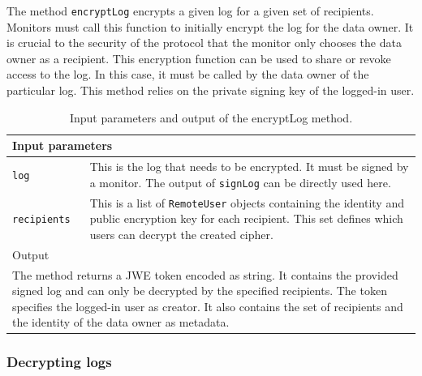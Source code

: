 \documentclass[../main.tex]{subfiles}
\begin{document}
The method \verb|encryptLog| encrypts a given log for a given set of recipients.
Monitors must call this function to initially encrypt the log for the data owner.
It is crucial to the security of the protocol that the monitor only chooses the data owner as a recipient. 
This encryption function can be used to share or revoke access to the log.
In this case, it must be called by the data owner of the particular log. 
This method relies on the private signing key of the logged-in user.
\begin{table}[ht]
    \centering
    \begin{tabular}{|p{3cm}p{10cm}|}
        \hline
        \multicolumn{2}{|l|}{Input parameters}    \\ \hline
        \verb|log|              & This is the log that needs to be encrypted. It must be signed by a monitor. The output of \verb|signLog| can be directly used here.           \\
        \verb|recipients|       & This is a list of \verb|RemoteUser| objects containing the identity and public encryption key for each recipient. This set defines which users can decrypt the created cipher.           \\ \hline
        \multicolumn{2}{|l|}{Output}   \\ \hline
        \multicolumn{2}{|p{13cm}|}{The method returns a JWE token encoded as string. It contains the provided signed log and can only be decrypted by the specified recipients. The token specifies the logged-in user as creator. It also contains the set of recipients and the identity of the data owner as metadata.} \\ \hline
    \end{tabular}
    \caption[Signature of encryptLog]{Input parameters and output of the encryptLog method.}
\end{table}

\subsubsection{Decrypting logs}
\end{document}
